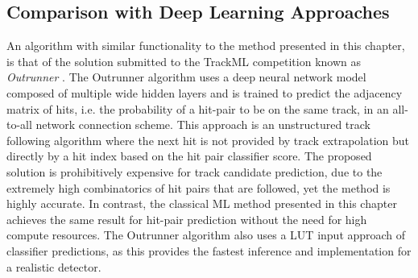 \subsection{Comparison with Deep Learning Approaches}


An algorithm with similar functionality to the method presented in this chapter, is that of the solution submitted to the TrackML competition known as \textit{Outrunner} \cite{Amrouche_2019}. The Outrunner algorithm uses a deep neural network model composed of multiple wide hidden layers and is trained to predict the adjacency matrix of hits, i.e. the probability of a hit-pair to be on the same track, in an all-to-all network connection scheme. This approach is an unstructured track following algorithm where the next hit is not provided by track extrapolation but directly by a hit index based on the hit pair classifier score. The proposed solution is prohibitively expensive for track candidate prediction, due to the extremely high combinatorics of hit pairs that are followed, yet the method is highly accurate. In contrast, the classical ML method presented in this chapter achieves the same result for hit-pair prediction without the need for high compute resources. The Outrunner algorithm also uses a LUT input approach of classifier predictions, as this provides the fastest inference and implementation for a realistic detector.



